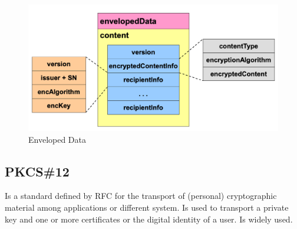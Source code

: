 \documentclass[12pt]{article}
\begin{document}
\begin{figure}[H]
   \centering
   \includegraphics[width=\linewidth]{images/envelopedData.png}
   \caption{Enveloped Data}
   \label{fig:envelopedData}
\end{figure}

\subsection{PKCS\#12}
Is a standard defined by RFC for the transport of (personal) cryptographic material among applications or different system. Is used to transport a private key and one or more certificates or the digital identity of a user. Is widely used.
\end{document}
